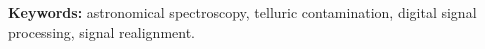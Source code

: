 \documentclass[12pt,twoside,a4paper]{book}
\begin{document}
\noindent \textbf{Keywords:} astronomical spectroscopy, telluric contamination, digital signal processing, signal realignment.


\tableofcontents    %









\mainmatter

\fancyhead[RE,LO]{\thesection}
\end{document}
